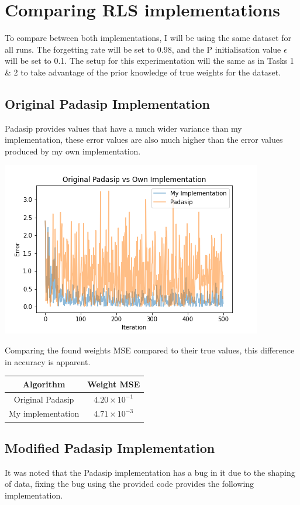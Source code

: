 \section{Comparing RLS implementations}
To compare between both implementations, I will be using the same dataset for all runs. The forgetting rate will be set to 0.98, and the P initialisation value $\epsilon$ will be set to 0.1.
The setup for this experimentation will the same as in Tasks 1 \& 2 to take advantage of the prior knowledge of true weights for the dataset.
\subsection{Original Padasip Implementation}
Padasip provides values that have a much wider variance than my implementation, these error  values are also much higher than the error values produced by my own implementation.

\includegraphics[width=\linewidth]{figs/OrigPadasip.png}

Comparing the found weights MSE compared to their true values, this difference in accuracy is apparent.
\begin{center}
    \begin{tabular}{| c c |}
        \hline
        Algorithm & Weight MSE \\ 
        \hline\hline
        Original Padasip & $4.20 \times 10^{-1}$\\ 
        My implementation & $4.71 \times 10^{-3}$\\
        \hline      
    \end{tabular}
\end{center}

\subsection{Modified Padasip Implementation}
It was noted that the Padasip implementation has a bug in it due to the shaping of data, fixing the bug using the provided code provides the following implementation.

